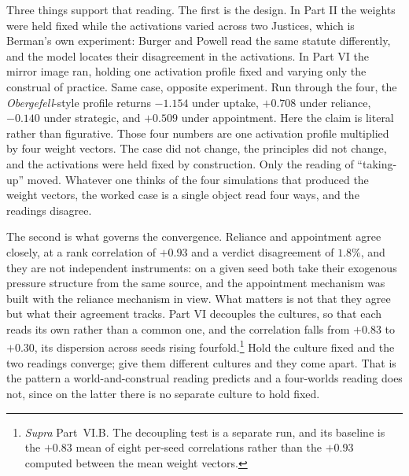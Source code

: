 Three things support that reading. The first is the design. In Part II the weights
were held fixed while the activations varied across two Justices, which is
Berman's own experiment: Burger and Powell read the same statute
differently, and the model locates their disagreement in the activations.
In Part VI the mirror image ran, holding one activation profile fixed and
varying only the construal of practice. Same case, opposite experiment.
Run through the four, the \textit{Obergefell}-style profile returns
$-1.154$ under uptake, $+0.708$ under reliance, $-0.140$ under strategic, and $+0.509$ under
appointment. Here the claim is literal rather than figurative. Those four numbers are one activation profile multiplied by four weight
vectors. The case did not change, the principles did not change, and the activations were held fixed by construction. Only the reading of
``taking-up'' moved. Whatever one thinks of the four simulations that produced the weight
vectors, the worked case is a single object read four ways, and the readings
disagree.

The second is what governs the convergence. Reliance and appointment agree
closely, at a rank correlation of $+0.93$ and a verdict disagreement of
$1.8\%$, and they are not independent instruments: on a given seed both take
their exogenous pressure structure from the same source, and the appointment
mechanism was built with the reliance mechanism in view. What matters is not
that they agree but what their agreement tracks. Part VI decouples the
cultures, so that each reads its own rather than a common one, and the
correlation falls from $+0.83$ to $+0.30$, its dispersion across seeds rising
fourfold.\footnote{\textit{Supra} Part~VI.B. The decoupling test is a separate
run, and its baseline is the $+0.83$ mean of eight per-seed correlations
rather than the $+0.93$ computed between the mean weight vectors.} Hold the
culture fixed and the two readings converge; give them different cultures and
they come apart. That is the pattern a world-and-construal reading predicts
and a four-worlds reading does not, since on the latter there is no separate
culture to hold fixed.

